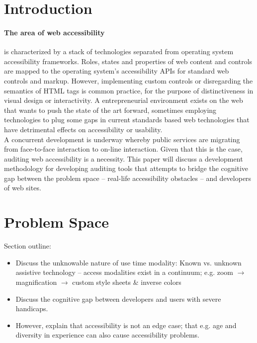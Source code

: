 \section{Introduction} %
\label{sec:introduction}

\paragraph{The area of web accessibility} %
 \label{par:the_area_of_web_accessibility}
 is characterized by a stack of technologies separated from operating system accessibility frameworks. Roles, states and properties of web content and controls are mapped to the operating system's accessibility APIs for standard web controls and markup. 
 However, implementing custom controls or disregarding the semantics of HTML tags is common practice, for the purpose of distinctiveness in visual design or interactivity. A entrepreneurial environment exists on the web that wants to push the state of the art forward, sometimes employing technologies to plug some gaps in current standards based web technologies that have detrimental effects on accessibility or usability.\\

A concurrent development is underway whereby public services are migrating from face-to-face interaction to on-line interaction. Given that this is the case, auditing web accessibility is a necessity. This paper will discuss a development methodology for developing auditing tools that attempts to bridge the cognitive gap between the problem space -- real-life accessibility obstacles -- and developers of web sites.


\section{Problem Space} %
\label{sec:problem_space}

Section outline:

\begin{itemize}
	\item Discuss the unknowable nature of use time modality: Known vs. unknown assistive technology -- access modalities exist in a continuum; e.g. zoom $\rightarrow$ magnification $\rightarrow$ custom style sheets \& inverse colors
	\item Discuss the cognitive gap between developers and users with severe handicaps.
	\item However, explain that accessibility is not an edge case; that e.g. age and diversity in experience can also cause accessibility problems.
\end{itemize}

